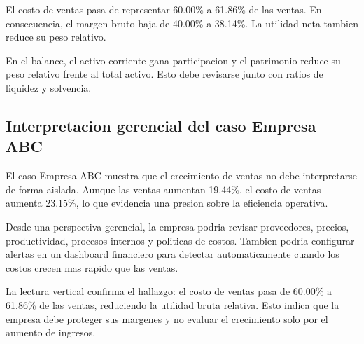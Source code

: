 El costo de ventas pasa de representar 60.00\% a 61.86\% de las ventas. En consecuencia, el margen bruto baja de 40.00\% a 38.14\%. La utilidad neta tambien reduce su peso relativo.

En el balance, el activo corriente gana participacion y el patrimonio reduce su peso relativo frente al total activo. Esto debe revisarse junto con ratios de liquidez y solvencia.

\subsection{Interpretacion gerencial del caso Empresa ABC}

El caso Empresa ABC muestra que el crecimiento de ventas no debe interpretarse de forma aislada. Aunque las ventas aumentan 19.44\%, el costo de ventas aumenta 23.15\%, lo que evidencia una presion sobre la eficiencia operativa.

Desde una perspectiva gerencial, la empresa podria revisar proveedores, precios, productividad, procesos internos y politicas de costos. Tambien podria configurar alertas en un dashboard financiero para detectar automaticamente cuando los costos crecen mas rapido que las ventas.

La lectura vertical confirma el hallazgo: el costo de ventas pasa de 60.00\% a 61.86\% de las ventas, reduciendo la utilidad bruta relativa. Esto indica que la empresa debe proteger sus margenes y no evaluar el crecimiento solo por el aumento de ingresos.
